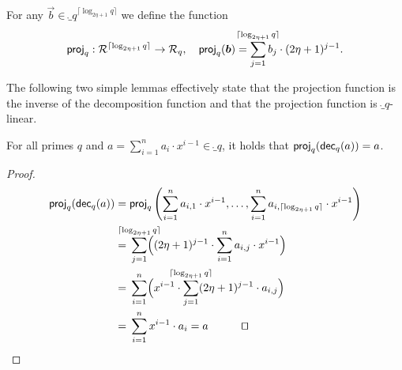 \begin{definition}\label{def:proj}
  For any $\vec{b} \in \ring_q^{\lceil\log_{2\eta+1} q\rceil}$ we define the function 
  \[
    \proj_q : \ring^{\lceil\log_{2\eta+1} q\rceil} \to \ring_q,\quad \proj_q(\vec{b}) = \smashoperator{\sum_{j=1}^{\lceil\log_{2\eta+1} q\rceil}} b_j\cdot(2\eta+1)^{j-1}.
  \]
\end{definition}
%
The following two simple lemmas effectively state that the projection function is the inverse of the decomposition function and that the projection function is $\ring_q$-linear.
\begin{lemma}\label{lem:projinvofbin}
  For all primes $q$ and $a = \sum_{i=1}^{n} a_i\cdot x^{i-1} \in\ring_q$, it holds that $\mathsf{proj}_q(\mathsf{dec}_q(a))=a$.
\end{lemma}
\begin{proof}
    \begin{align*}
      \proj_q(\decomp_q(a)) ={}& \proj_q\left(\sum_{i=1}^{n} a_{i,1}\cdot x^{i-1}, \dots, \sum_{i=1}^{n} a_{i,\lceil\log_{2\eta+1} q\rceil}\cdot x^{i-1}\right)\\
      ={}& \smashoperator{\sum_{j=1}^{\lceil\log_{2\eta+1} q\rceil}} \Bigl((2\eta+1)^{j-1} \cdot \sum_{i=1}^{n} a_{i,j}\cdot x^{i-1}\Bigr)\\
      ={}& \sum_{i=1}^{n} \Bigl(x^{i-1}\cdot \smashoperator{\sum_{j=1}^{\lceil\log_{2\eta+1} q\rceil}} (2\eta+1)^{j-1} \cdot a_{i,j}\Bigr)\\
      ={}& \sum_{i=1}^{n} x^{i-1}\cdot a_i=a\tag*{\qed}
    \end{align*}
\end{proof}
  


